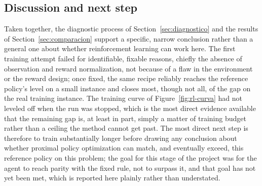 \documentclass[11pt,a4paper]{article}
\begin{document}
\subsection{Discussion and next step}

Taken together, the diagnostic process of Section~\ref{sec:diagnostico} and the results of Section~\ref{sec:comparacion} support a specific, narrow conclusion rather than a general one about whether reinforcement learning can work here. The first training attempt failed for identifiable, fixable reasons, chiefly the absence of observation and reward normalization, not because of a flaw in the environment or the reward design; once fixed, the same recipe reliably reaches the reference policy's level on a small instance and closes most, though not all, of the gap on the real training instance. The training curve of Figure~\ref{fig:rl-curva} had not leveled off when the run was stopped, which is the most direct evidence available that the remaining gap is, at least in part, simply a matter of training budget rather than a ceiling the method cannot get past. The most direct next step is therefore to train substantially longer before drawing any conclusion about whether proximal policy optimization can match, and eventually exceed, this reference policy on this problem; the goal for this stage of the project was for the agent to reach parity with the fixed rule, not to surpass it, and that goal has not yet been met, which is reported here plainly rather than understated.



\end{document}
